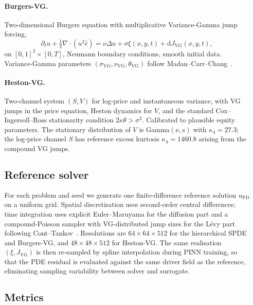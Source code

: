 \documentclass[10pt]{elsarticle}
\begin{document}
\paragraph{Burgers-VG.}
Two-dimensional Burgers equation with multiplicative
Variance-Gamma jump forcing,
\begin{equation}
\partial_t u + \tfrac12 \nabla \cdot (u^2 \hat e)
= \nu \Delta u + \sigma \xi(x, y, t)
+ \mathrm dJ_{\mathrm{VG}}(x, y, t),
\label{eq:burgersvg}
\end{equation}
on \([0,1]^2 \times [0, T]\), Neumann boundary conditions, smooth
initial data. Variance-Gamma parameters
\((\sigma_{\mathrm{VG}}, \nu_{\mathrm{VG}}, \theta_{\mathrm{VG}})\)
follow Madan--Carr--Chang~\cite{MadanCarrChang1998}.

\paragraph{Heston-VG.}
Two-channel system \((S, V)\) for log-price and instantaneous
variance, with VG jumps in the price equation, Heston dynamics for
\(V\), and the standard Cox--Ingersoll--Ross stationarity
condition \(2\kappa\theta > \sigma^2\). Calibrated to plausible
equity parameters. The stationary distribution of \(V\) is
Gamma\((\nu, s)\) with \(\kappa_4 = 27.3\); the log-price channel
\(S\) has reference excess kurtosis \(\kappa_4 = 1460.8\) arising
from the compound VG jumps.

\subsection{Reference solver}

For each problem and seed we generate one finite-difference
reference solution \(u_{\mathrm{FD}}\) on a uniform grid. Spatial
discretisation uses second-order central differences; time
integration uses explicit Euler--Maruyama for the diffusion part
and a compound-Poisson sampler with VG-distributed jump sizes for
the L\'evy part following Cont--Tankov~\cite{ContTankov2003}.
Resolutions are \(64\times 64 \times 512\) for the hierarchical
SPDE and Burgers-VG, and \(48\times 48 \times 512\) for
Heston-VG. The same realisation \((\xi, J_{\mathrm{VG}})\) is then
re-sampled by spline interpolation during PINN training, so that
the PDE residual is evaluated against the same driver field as
the reference, eliminating sampling variability between solver and
surrogate.

\subsection{Metrics}
\label{subsec:metrics}
\end{document}
